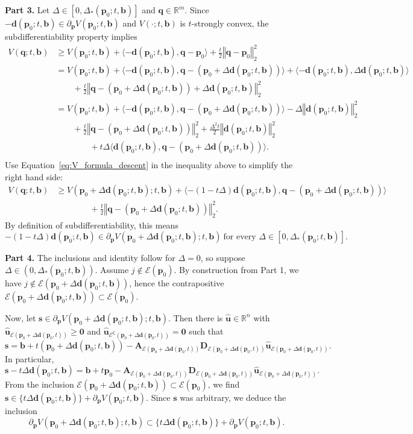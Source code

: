 \documentclass[11pt]{article}
\numberwithin{prop}{section}
\numberwithin{lem}{section}
\numberwithin{rem}{section}
\numberwithin{cor}{section}
\numberwithin{thm}{section}
\numberwithin{defn}{section}
\numberwithin{fact}{section}
\theoremstyle{plain}
\def\bb {\boldsymbol{b}}
\def\bd {\boldsymbol{d}}
\def\bp {\boldsymbol{p}}
\def\bq {\boldsymbol{q}}
\def\bu {\boldsymbol{u}}
\def\bs {\boldsymbol{s}}
\def\R {\mathbb{R}}
\newcommand{\normsq}[1]{\left\Vert{#1} \right\Vert_{2}^{2}}
\newcommand{\matr}[1]{\bm{#1}}
\def\Rn {\R^n}
\def\Rm {\R^m}
\def\bpo {\bp_{0}}
\def\epdo {\mathcal{E}(\bpo + \Delta\bd(\bpo,t))}
\def\ecpdo {\mathcal{E}^{\mathsf{C}}(\bpo + \Delta\bd(\bpo,t))}
\def\epo {\mathcal{E}(\bp_{0})}
\begin{document}
\noindent
\newline
\textbf{Part 3.} Let $\Delta \in [0,\Delta_{*}(\bpo;t,\bb)]$ and $\bq \in \Rm$. Since $-\bd(\bpo;t,\bb) \in \partial_{\bp} V(\bpo;t,\bb)$ and $V(\cdot;t,\bb)$ is $t$-strongly convex, the subdifferentiability property implies
\[
\begin{alignedat}{1}
V(\bq;t,\bb) &\geqslant V(\bpo;t,\bb) + \langle-\bd(\bpo;t,\bb), \bq - \bpo\rangle + \frac{t}{2}\normsq{\bq-\bpo}\\
&= V(\bpo;t,\bb) + \langle-\bd(\bpo;t,\bb),\bq - (\bpo + \Delta\bd(\bpo;t,\bb))\rangle + \langle-\bd(\bpo;t,\bb),\Delta\bd(\bpo;t,\bb)\rangle \\
&\qquad + \frac{t}{2}\normsq{\bq - (\bpo + \Delta\bd(\bpo;t,\bb)) + \Delta\bd(\bpo;t,\bb)} \\
&= V(\bpo;t,\bb) + \langle-\bd(\bpo;t,\bb),\bq - (\bpo + \Delta\bd(\bpo;t,\bb))\rangle - \Delta\normsq{\bd(\bpo;t,\bb)}\\
&\qquad + \frac{t}{2}\normsq{\bq - (\bpo + \Delta\bd(\bpo;t,\bb))} + \frac{\Delta^2 t}{2}\normsq{\bd(\bpo;t,\bb)} \\
&\qquad\qquad + t \Delta\langle\bd(\bpo;t,\bb),\bq - (\bpo + \Delta\bd(\bpo;t,\bb))\rangle. \\
\end{alignedat}
\]
Use Equation~\eqref{eq:V_formula_descent} in the inequality above to simplify the right hand side:
\[
\begin{alignedat}{1}
V(\bq;t,\bb) &\geqslant V(\bpo + \Delta\bd(\bpo;t,\bb);t,\bb) + \langle-(1-t \Delta)\bd(\bpo;t,\bb),\bq - (\bpo + \Delta\bd(\bpo;t,\bb))\rangle \\
&\qquad\qquad + \frac{t}{2}\normsq{\bq - (\bpo + \Delta\bd(\bpo;t,\bb))}.
\end{alignedat}
\]
By definition of subdifferentiability, this means
\[
-(1-t \Delta)\bd(\bpo;t,\bb) \in \partial_{\bp} V(\bpo + \Delta\bd(\bpo;t,\bb);t,\bb) \ \text{for every $\Delta \in [0,\Delta_{*}(\bpo;t,\bb)]$}.
\]


\noindent
\newline
\textbf{Part 4.} The inclusions and identity follow for $\Delta = 0$, so suppose $\Delta \in (0,\Delta_{*}(\bpo;t,\bb))$. Assume $j \notin \epo$. By construction from Part 1, we have $j \notin \mathcal{E}(\bpo + \Delta\bd(\bpo;t,\bb))$, hence the contrapositive $\mathcal{E}(\bpo + \Delta\bd(\bpo;t,\bb)) \subset \epo$.

Now, let $\bs \in \partial_{\bp}V(\bpo + \Delta\bd(\bpo;t,\bb);t,\bb)$. Then there is $\hat{\bu} \in \Rn$ with $\hat{\bu}_{\epdo} \geqslant \boldsymbol{0}$ and $\hat{\bu}_{\ecpdo} = \boldsymbol{0}$ such that
\[
\bs = \bb + t(\bpo + \Delta\bd(\bpo;t,\bb)) - \matr{A}_{\epdo}\matr{D}_{\epdo}\hat{\bu}_{\epdo}.
\]
In particular,
\[
\bs - t \Delta\bd(\bpo;t,\bb) = \bb + t\bpo  - \matr{A}_{\epdo}\matr{D}_{\epdo}\hat{\bu}_{\epdo}.
\]
From the inclusion $\mathcal{E}(\bpo + \Delta\bd(\bpo;t,\bb)) \subset \epo$, we find $\bs \in \{t \Delta\bd(\bpo;t,\bb)\} + \partial_{\bp}V(\bpo;t,\bb)$. Since $\bs$ was arbitrary, we deduce the inclusion
\[
\partial_{\bp}V(\bpo + \Delta\bd(\bpo;t,\bb);t,\bb) \subset \{t\Delta\bd(\bpo;t,\bb)\} + \partial_{\bp}V(\bpo;t,\bb).
\]
\end{document}
